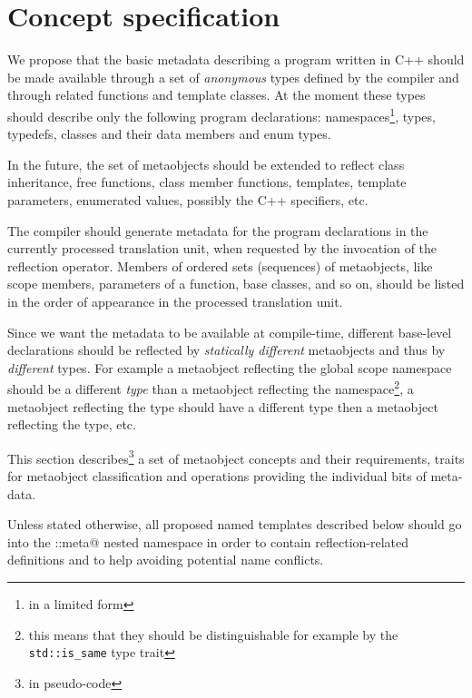 \section{Concept specification}
\label{section-current-Concepts}

We propose that the basic metadata describing a program written
in C++ should be made available through a set of {\em anonymous} types
defined by the compiler and through related functions and template classes.
At the moment these types should describe only the following program
declarations: namespaces\footnote{in a limited form}, types, typedefs,
classes and their data members and enum types.

In the future, the set of metaobjects should be extended to reflect
class inheritance, free functions, class member functions, templates,
template parameters, enumerated values, possibly the C++ specifiers, etc.

The compiler should generate metadata for the program declarations
in the currently processed translation unit, when requested by the invocation
of the reflection operator. Members of ordered sets (sequences) of metaobjects,
like scope members, parameters of a function, base classes, and so on, should be listed
in the order of appearance in the processed translation unit.

Since we want the metadata to be available at compile-time,
different base-level declarations should be reflected by
{\em statically different} metaobjects and thus by {\em different} types.
For example a metaobject reflecting the global scope namespace should
be a different {\em type} than a metaobject reflecting the \verb@std@
namespace\footnote{this means that they should be distinguishable for
example by the \texttt{std::is\_same} type trait},
a metaobject reflecting the \verb@int@ type should
have a different type then a metaobject reflecting the \verb@double@
type, etc.

This section describes\footnote{in pseudo-code} a set of metaobject concepts
and their requirements, traits for metaobject classification and operations
providing the individual bits of meta-data.

Unless stated otherwise, all proposed named templates described below should
go into the \verb@std::meta@ nested namespace in order to contain reflection-related
definitions and to help avoiding potential name conflicts.

























